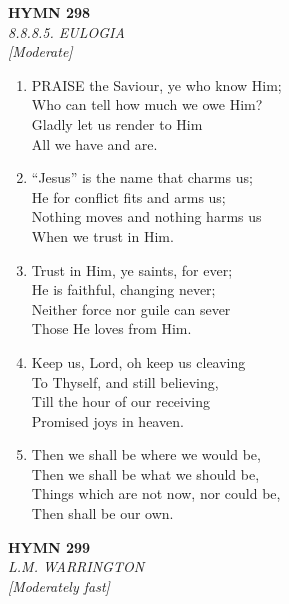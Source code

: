 \documentclass[11pt,a4paper]{article}
\begin{document}
\newpage
\begin{center}
    {\Large \textbf{HYMN 298}}
    \\
    \textit{8.8.8.5. EULOGIA}
    \\
    \textit{\small [Moderate]}
\end{center}
\vspace{1em}

\begin{enumerate}
    \item PRAISE the Saviour, ye who know Him; \\
        Who can tell how much we owe Him? \\
        Gladly let us render to Him \\
        All we have and are.

    \item ``Jesus'' is the name that charms us; \\
        He for conflict fits and arms us; \\
        Nothing moves and nothing harms us \\
        When we trust in Him.

    \item Trust in Him, ye saints, for ever; \\
        He is faithful, changing never; \\
        Neither force nor guile can sever \\
        Those He loves from Him.

    \item Keep us, Lord, oh keep us cleaving \\
        To Thyself, and still believing, \\
        Till the hour of our receiving \\
        Promised joys in heaven.

    \item Then we shall be where we would be, \\
        Then we shall be what we should be, \\
        Things which are not now, nor could be, \\
        Then shall be our own.

\end{enumerate}

\newpage
\begin{center}
    {\Large \textbf{HYMN 299}}
    \\
    \textit{L.M. WARRINGTON}
    \\
    \textit{\small [Moderately fast]}
\end{center}
\vspace{1em}
\end{document}
